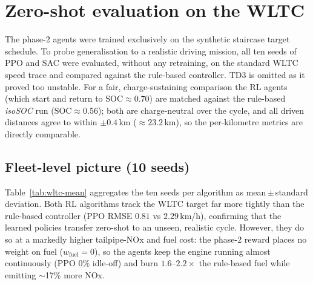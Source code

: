 
\section{Zero-shot evaluation on the WLTC}
\label{sec:wltc-comparison}

The phase-2 agents were trained exclusively on the synthetic staircase target
schedule. To probe generalisation to a realistic driving mission, all ten seeds
of PPO and SAC were evaluated, without any retraining, on the standard WLTC
speed trace and compared against the rule-based controller. TD3 is omitted as it
proved too unstable. For a fair, charge-sustaining comparison the RL agents
(which start and return to $\mathrm{SOC}\approx0.70$) are matched against the
rule-based \emph{isoSOC} run ($\mathrm{SOC}\approx0.56$); both are
charge-neutral over the cycle, and all driven distances agree to within
$\pm0.4$\,\si{km} ($\approx23.2$\,\si{km}), so the per-kilometre metrics are
directly comparable.

\subsection{Fleet-level picture (10 seeds)}

Table~\ref{tab:wltc-mean} aggregates the ten seeds per algorithm as
mean\,$\pm$\,standard deviation. Both RL algorithms track the WLTC target far
more tightly than the rule-based controller (PPO RMSE $0.81$ vs $2.29$\,\si{km/h}),
confirming that the learned policies transfer zero-shot to an unseen, realistic
cycle. However, they do so at a markedly higher tailpipe-NOx and fuel cost: the
phase-2 reward places no weight on fuel ($w_\text{fuel}=0$), so the agents keep
the engine running almost continuously (PPO $0\%$ idle-off) and burn
$1.6$--$2.2\times$ the rule-based fuel while emitting $\sim$17\% more NOx.

